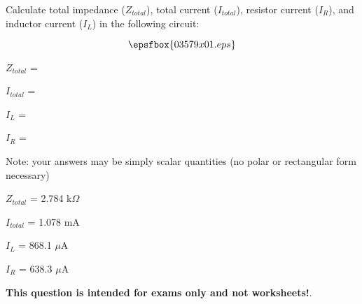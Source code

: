 

Calculate total impedance ($Z_{total}$), total current ($I_{total}$), resistor current ($I_R$), and inductor current ($I_L$) in the following circuit:

$$\epsfbox{03579x01.eps}$$

$Z_{total}$ =

\vskip 10pt

$I_{total}$ = 

\vskip 10pt

$I_{L}$ = 

\vskip 10pt

$I_{R}$ = 

\vskip 10pt

Note: your answers may be simply scalar quantities (no polar or rectangular form necessary)







$Z_{total}$ = 2.784 k$\Omega$

\vskip 10pt

$I_{total}$ = 1.078 mA

\vskip 10pt

$I_{L}$ = 868.1 $\mu$A

\vskip 10pt

$I_{R}$ = 638.3 $\mu$A







{\bf This question is intended for exams only and not worksheets!}.



